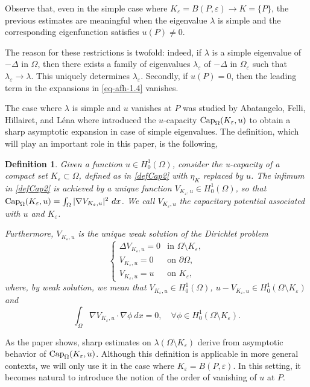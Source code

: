 \documentclass[11pt,reqno]{article}
\newtheorem{defi}[teo]{Definition}
\numberwithin{equation}{section}
\newcommand\e\varepsilon
\newcommand\la\lambda
\renewcommand\O\Omega
\begin{document}
Observe that, even in the simple case where $K_\e=B(P,\e)\to K=\{P\}$, the previous estimates are meaningful when the eigenvalue $\lambda$ is simple and the corresponding eigenfunction satisfies $u(P)\neq 0$.

The reason for these restrictions is twofold: indeed, if $\la$ is a simple eigenvalue of $-\Delta$ in $\O$, then there exists a family of eigenvalues $\la_\e$ of $-\Delta$ in $\O_\e$ such that $\la_\e \to \la$. This uniquely determines $\lambda_\varepsilon$.  Secondly, if $u(P)=0$, then the leading term in the expansions in \eqref{eq-afh-1.4} vanishes.

The case where $\lambda$ is simple and $u$ vanishes at $P$ was studied by Abatangelo, Felli, Hillairet, and L\'ena \cite{afhl} where introduced the $u$-capacity  $\hbox{Cap}_\O(K_\e,u)$ to obtain a sharp asymptotic expansion in case of simple eigenvalues. The definition, which will play an important role in this paper, is the following,
    \begin{defi}\label{intr-def-Cap}
    Given a function $u\in H_0^1(\O)$, consider the u-capacity of a compact set $K_\e\subset\O$, defined as in \eqref{defCap2} with  $\eta_K$ replaced by $u$.
    The infimum in \eqref{defCap2} is achieved by a unique function $V_{K_\e,u}\in H_0^1(\O)$, so that $\hbox{Cap}_\O(K_\e,u)=\int_\O|\nabla V_{K_\e,u}|^2\ dx$. We call $V_{K_\e,u}$ the capacitary potential associated with $u$ and $K_\e$.

    Furthermore, $V_{K_\e,u}$ is the unique weak solution of the Dirichlet problem 
    \begin{equation*}
		\begin{cases}
			\Delta V_{K_\e,u} =0 &\text{in }\Omega\setminus K_\e,\\
			V_{K_\e,u} =0 &\text{on }\partial \Omega,\\
			V_{K_\e,u} =u &\text{on }K_\e,
		\end{cases}
	\end{equation*}
    where, by weak solution, we mean that $V_{K_\e,u}\in H_0^1(\O)$, $u-V_{K_\e,u}\in H_0^1(\O\setminus K_\e)$ and 
    $$\int_{\O}\nabla V_{K_\e,u}\cdot\nabla\phi\ dx=0,\quad \forall\phi\in H^1_0(\O\setminus K_\e).
    $$
    \end{defi}
    As the paper \cite{afhl} shows, sharp estimates on $ \lambda(\O\setminus K_\e)$ derive from asymptotic behavior of $\hbox{Cap}_\O(K_\e,u)$.
Although this definition is applicable in more general contexts, we will only use it in the case where $K_\e=B(P,\e)$. In this setting, it becomes natural to introduce the notion of the order of vanishing of $u$ at $P$.
\end{document}
